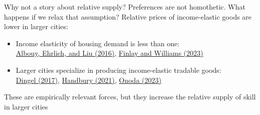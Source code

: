\documentclass[11pt,notes=hide,aspectratio=169]{beamer}
\begin{document}
\begin{frame}{Why not a story about relative supply?}
Preferences are not homothetic.
What happens if we relax that assumption?
\smallskip
Relative prices of income-elastic goods are lower in larger cities:
\begin{itemize}
\item Income elasticity of housing demand is less than one:\\
\href{https://www.nber.org/papers/w22816}{Albouy, Ehrlich, and Liu (2016)}, \href{https://trevorcwilliams.github.io/files/submission_fw.pdf}{Finlay and Williams (2023)}
\item Larger cities specialize in producing income-elastic tradable goods:\\
\href{https://doi.org/10.1093/restud/rdw054}{Dingel (2017)}, \href{https://doi.org/10.3982/ECTA11738}{Handbury (2021)}, \href{https://www.tksonoda.com/}{Onoda (2023)}
\end{itemize}
These are empirically relevant forces,
but they increase the relative supply of skill in larger cities
\end{frame}
\end{document}
